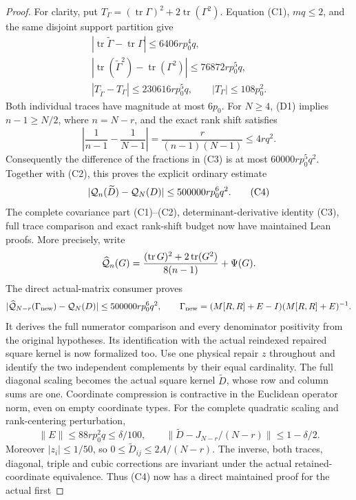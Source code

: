 \begin{proof}
For clarity, put
\(T_\Gamma=(\operatorname{tr}\Gamma)^2+
2\operatorname{tr}(\Gamma^2)\). Equation (C1), \(mq\leq2\),
and the same disjoint support partition give
\[
 \begin{gathered}
 |\operatorname{tr}\widetilde\Gamma-
                    \operatorname{tr}\Gamma|
                       \leq6406rp_0^4q,\\
 |\operatorname{tr}(\widetilde\Gamma^2)-
                    \operatorname{tr}(\Gamma^2)|
                       \leq76872rp_0^5q,\\
 |T_{\widetilde\Gamma}-T_\Gamma|
                       \leq230616rp_0^5q,\qquad
 |T_\Gamma|\leq108p_0^2 .
 \end{gathered}
\]
Both individual traces have magnitude at most \(6p_0\).
For \(N\geq4\), (D1) implies \(n-1\geq N/2\), where \(n=N-r\),
and the exact rank shift satisfies
\[
 \left|\frac1{n-1}-\frac1{N-1}\right|
   =\frac r{(n-1)(N-1)}\leq4rq^2 .
\]
Consequently the difference of the fractions in (C3) is at most
\(60000rp_0^5q^2\). Together with (C2), this proves the explicit
ordinary estimate
\[
 |{\cal Q}_n(\widetilde D)-{\cal Q}_N(D)|
       \leq500000rp_0^6q^2 .                 \tag{C4}
\]
The complete covariance part (C1)--(C2), determinant-derivative
identity (C3), full trace comparison and exact rank-shift budget
now have maintained Lean proofs. More precisely, write
\[
 \widehat{\cal Q}_n(G)=
 \frac{(\operatorname{tr}G)^2+2\operatorname{tr}(G^2)}{8(n-1)}
       +\Psi(G).
\]
The direct actual-matrix consumer proves
\[
 |\widehat{\cal Q}_{N-r}(\Gamma_{\rm new})-{\cal Q}_N(D)|
       \leq500000rp_0^6q^2,\qquad
 \Gamma_{\rm new}=(M[R,R]+E-I)(M[R,R]+E)^{-1}.
\]
It derives the full numerator comparison and every denominator
positivity from the original hypotheses. Its identification with
the actual reindexed repaired square kernel is now formalized too.
Use one physical repair \(z\) throughout and identify the two
independent complements by their equal cardinality. The full diagonal
scaling becomes the actual square kernel \(\widetilde D\), whose
row and column sums are one. Coordinate compression is contractive
in the Euclidean operator norm, even on empty coordinate types.
For the complete quadratic scaling and rank-centering perturbation,
\[
 \|E\|\leq88rp_0^2q\leq\delta/100,
 \qquad
 \|\widetilde D-J_{N-r}/(N-r)\|\leq1-\delta/2.
\]
Moreover \(|z_i|\leq1/50\), so
\(0\leq\widetilde D_{ij}\leq2A/(N-r)\).
The inverse, both traces, diagonal, triple and cubic corrections
are invariant under the actual retained-coordinate equivalence.
Thus (C4) now has a direct maintained proof for the actual first

\end{proof}
